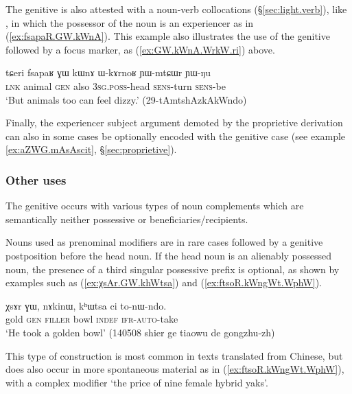 The genitive is also attested with a noun-verb collocations (§\ref{sec:light.verb}), like , in which the possessor  of the noun is an experiencer as in (\ref{ex:fsapaR.GW.kWnA}). This example also illustrates the use of the genitive followed by a focus marker, as (\ref{ex:GW.kWnA.WrkW.ri}) above.

\begin{exe}
\ex \label{ex:fsapaR.GW.kWnA}
\gll tɕeri fsapaʁ ɣɯ kɯnɤ ɯ-kɤrnoʁ ɲɯ-mtɕɯr ɲɯ-ŋu \\
\textsc{lnk} animal \textsc{gen} also \textsc{3sg}.\textsc{poss}-head \textsc{sens}-turn \textsc{sens}-be \\
\glt `But animals too can feel dizzy.' (29-tAmtshAzkAkWndo)
\end{exe}

Finally, the experiencer subject argument demoted by the proprietive derivation can also in some cases be optionally encoded with the genitive case (see example \ref{ex:aZWG.mAsAscit}, §\ref{sec:proprietive}).

\subsubsection{Other uses} \label{sec:gen.other}
The genitive  occurs with various types of noun complements which are semantically neither possessive or beneficiaries/recipients. 

Nouns used as prenominal modifiers are in rare cases followed by a genitive postposition before the head noun. If the head noun is an alienably possessed noun, the presence of a third singular possessive prefix  is optional, as shown by examples such as (\ref{ex:χsAr.GW.khWtsa}) and (\ref{ex:ftsoR.kWngWt.WphW}). 

\begin{exe}
\ex \label{ex:χsAr.GW.khWtsa}
\gll  χsɤr ɣɯ, nɤkinɯ, kʰɯtsa ci to-nɯ-ndo. \\
gold \textsc{gen} \textsc{filler} bowl \textsc{indef} \textsc{ifr}-\textsc{auto}-take \\
\glt `He took a golden bowl' (140508 shier ge tiaowu de gongzhu-zh)
\end{exe}

This type of construction is most common in texts translated from Chinese, but does also occur in more spontaneous material as in (\ref{ex:ftsoR.kWngWt.WphW}), with a complex modifier  `the price of nine female hybrid yaks'.

